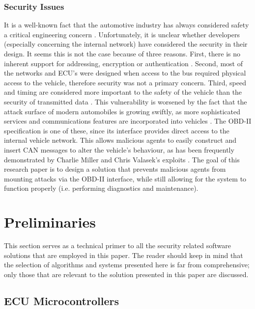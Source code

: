 \subsubsection{Security Issues}
\label{subsec:obd:security_issues}

It is a well-known fact that the automotive industry has always considered safety a critical engineering concern \cite{Dyer}. Unfortunately, it is unclear whether developers (especially concerning the internal network) have considered the security in their design. It seems this is not the case because of three reasons. First, there is no inherent support for addressing, encryption or authentication \cite{MillerB}. Second, most of the networks and ECU's were designed when access to the bus required physical access to the vehicle, therefore security was not a primary concern. Third, speed and timing are considered more important to the safety of the vehicle than the security of transmitted data \cite{Klinedinst05}. This vulnerability is worsened by the fact that the attack surface of modern automobiles is growing swiftly, as more sophisticated services and communications features are incorporated into vehicles \cite{Kosher}. The OBD-II specification is one of these, since its interface provides direct access to the internal vehicle network. This allows malicious agents to easily construct and insert CAN messages to alter the vehicle's behaviour, as has been frequently demonstrated by Charlie Miller and Chris Valasek's exploits \cite{MillerA, MillerB, MillerC}. The goal of this research paper is to design a solution that prevents malicious agents from mounting attacks via the OBD-II interface, while still allowing for the system to function properly (i.e. performing diagnostics and maintenance). 

\section{Preliminaries}
\label{chap:preliminaries}

This section serves as a technical primer to all the security related software solutions that are employed in this paper. The reader should keep in mind that the selection of algorithms and systems presented here is far from comprehensive; only those that are relevant to the solution presented in this paper are discussed.

\subsection{ECU Microcontrollers}
\label{sec:microcontrollers}


